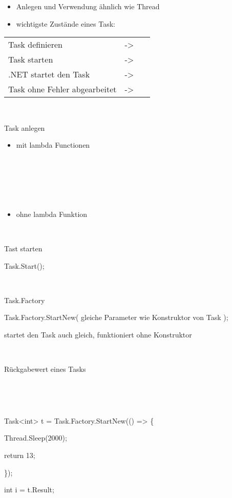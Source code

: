 \begin{itemize}
\item Anlegen und Verwendung ähnlich wie Thread
\item wichtigste Zustände eines Task:
\end{itemize}
\begin{flushleft}
\tablefirsthead{}
\tablehead{}
\tabletail{}
\tablelasttail{}
\begin{supertabular}{m{6.3700004cm}m{1.4929999cm}m{1.0699999cm}}
Task definieren &
{}-{\textgreater} &
~\\
Task starten   &
{}-{\textgreater} &
~\\
.NET startet den Task &
{}-{\textgreater} &
~\\
Task ohne Fehler abgearbeitet &
{}-{\textgreater}  &
~\\
\end{supertabular}
\end{flushleft}
~

Task anlegen

\begin{itemize}
\item mit lambda Functionen
\end{itemize}
~

~

~

\begin{itemize}
\item ohne lambda Funktion
\end{itemize}
~

Tast starten

Task.Start();

~

Task.Factory

Task.Factory.StartNew( gleiche Parameter wie Konstruktor von Task );  

startet den Task auch gleich, funktioniert ohne Konstruktor

~

Rückgabewert eines Tasks

~

~

Task{\textless}int{\textgreater} t = Task.Factory.StartNew(() ={\textgreater} \{ 

Thread.Sleep(2000); 

return 13; 

\}); 

int i = t.Result;

~

~

